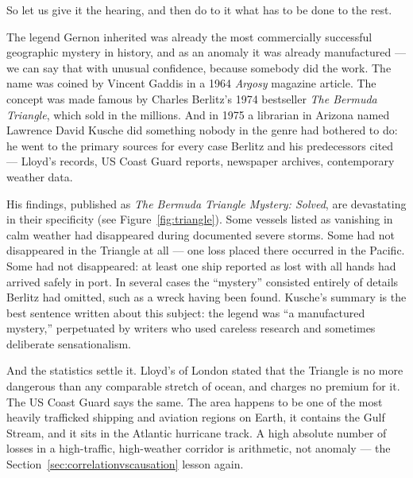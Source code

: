 So let us give it the hearing, and then do to it what has to be done to the rest.

The legend Gernon inherited was already the most commercially successful geographic mystery in
history, and as an anomaly it was already manufactured --- we can say that with unusual
confidence, because somebody did the work. The name was coined by Vincent Gaddis in a 1964
\emph{Argosy} magazine article. The concept was made famous by Charles Berlitz's 1974 bestseller
\emph{The Bermuda Triangle}, which sold in the millions. And in 1975 a librarian in Arizona named
Lawrence David Kusche did something nobody in the genre had bothered to do: he went to the primary
sources for every case Berlitz and his predecessors cited --- Lloyd's records, US Coast Guard
reports, newspaper archives, contemporary weather data.

His findings, published as \emph{The Bermuda Triangle Mystery: Solved}, are devastating in their specificity (see Figure~\ref{fig:triangle}). Some vessels listed as vanishing in calm weather had disappeared during
documented severe storms. Some had not disappeared in the Triangle at all --- one loss placed
there occurred in the Pacific. Some had not disappeared: at least one ship reported as lost
with all hands had arrived safely in port. In several cases the ``mystery'' consisted
entirely of details Berlitz had omitted, such as a wreck having been found. Kusche's summary
is the best sentence written about this subject: the legend was ``a manufactured mystery,''
perpetuated by writers who used careless research and sometimes deliberate
sensationalism.

And the statistics settle it. Lloyd's of London stated that the Triangle is no more dangerous
than any comparable stretch of ocean, and charges no premium for it. The US Coast Guard says
the same. The area happens to be one of the most heavily trafficked shipping and aviation
regions on Earth, it contains the Gulf Stream, and it sits in the Atlantic hurricane track.
A high absolute number of losses in a high-traffic, high-weather corridor is arithmetic, not
anomaly --- the Section~\ref{sec:correlationvscausation} lesson again.


